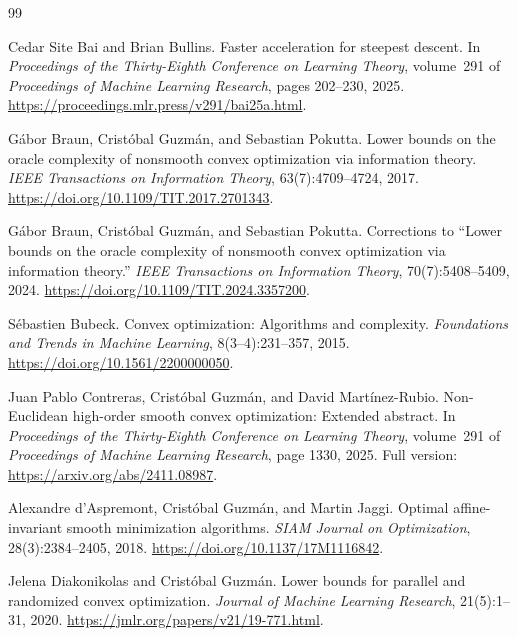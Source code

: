 \documentclass[11pt]{article}
\theoremstyle{definition}
\theoremstyle{remark}
\begin{document}
\clearpage
\begin{thebibliography}{99}

Cedar Site Bai and Brian Bullins.
Faster acceleration for steepest descent.
In \emph{Proceedings of the Thirty-Eighth Conference on Learning Theory},
volume~291 of \emph{Proceedings of Machine Learning Research}, pages 202--230, 2025.
\url{https://proceedings.mlr.press/v291/bai25a.html}.

G\'abor Braun, Crist\'obal Guzm\'an, and Sebastian Pokutta.
Lower bounds on the oracle complexity of nonsmooth convex optimization via information theory.
\emph{IEEE Transactions on Information Theory}, 63(7):4709--4724, 2017.
\url{https://doi.org/10.1109/TIT.2017.2701343}.

G\'abor Braun, Crist\'obal Guzm\'an, and Sebastian Pokutta.
Corrections to ``Lower bounds on the oracle complexity of nonsmooth convex optimization via information theory.''
\emph{IEEE Transactions on Information Theory}, 70(7):5408--5409, 2024.
\url{https://doi.org/10.1109/TIT.2024.3357200}.

S\'ebastien Bubeck.
Convex optimization: Algorithms and complexity.
\emph{Foundations and Trends in Machine Learning}, 8(3--4):231--357, 2015.
\url{https://doi.org/10.1561/2200000050}.

Juan Pablo Contreras, Crist\'obal Guzm\'an, and David Mart\'inez-Rubio.
Non-Euclidean high-order smooth convex optimization: Extended abstract.
In \emph{Proceedings of the Thirty-Eighth Conference on Learning Theory},
volume~291 of \emph{Proceedings of Machine Learning Research}, page 1330, 2025.
Full version: \url{https://arxiv.org/abs/2411.08987}.

Alexandre d'Aspremont, Crist\'obal Guzm\'an, and Martin Jaggi.
Optimal affine-invariant smooth minimization algorithms.
\emph{SIAM Journal on Optimization}, 28(3):2384--2405, 2018.
\url{https://doi.org/10.1137/17M1116842}.

Jelena Diakonikolas and Crist\'obal Guzm\'an.
Lower bounds for parallel and randomized convex optimization.
\emph{Journal of Machine Learning Research}, 21(5):1--31, 2020.
\url{https://jmlr.org/papers/v21/19-771.html}.


\end{thebibliography}
\end{document}
